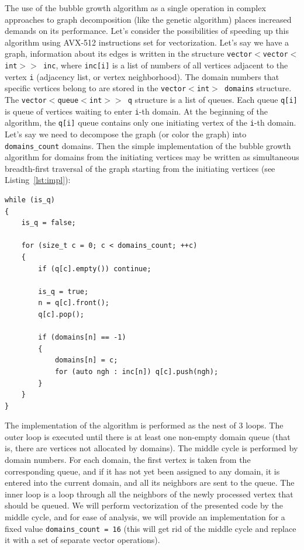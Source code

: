 \documentclass[
11pt,%
tightenlines,%
twoside,%
onecolumn,%
nofloats,%
nobibnotes,%
nofootinbib,%
superscriptaddress,%
noshowpacs,%
centertags]%
{revtex4}
\begin{document}
The use of the bubble growth algorithm as a single operation in complex approaches to graph decomposition (like the genetic algorithm) places increased demands on its performance.
Let's consider the possibilities of speeding up this algorithm using AVX-512 instructions set for vectorization.
Let's say we have a graph, information about its edges is written in the structure \texttt{vector$<$vector$<$int$>>$ inc}, where \texttt{inc[i]} is a list of numbers of all vertices adjacent to the vertex \texttt{i} (adjacency list, or vertex neighborhood).
The domain numbers that specific vertices belong to are stored in the \texttt{vector$<$int$>$ domains} structure.
The \texttt{vector$<$queue$<$int$>>$ q} structure is a list of queues.
Each queue \texttt{q[i]} is queue of vertices waiting to enter \texttt{i}-th domain.
At the beginning of the algorithm, the \texttt{q[i]} queue contains only one initiating vertex of the \texttt{i}-th domain.
Let's say we need to decompose the graph (or color the graph) into \texttt{domains\_count} domains.
Then the simple implementation of the bubble growth algorithm for domains from the initiating vertices may be written as simultaneous breadth-first traversal of the graph starting from the initiating vertices (see Listing~\ref{lst:impl}):

\begin{lstlisting}[caption={Implementation of the bubble domain growth algorithm.},label={lst:impl}]
while (is_q)
{
    is_q = false;

    for (size_t c = 0; c < domains_count; ++c)
    {
        if (q[c].empty()) continue;

        is_q = true;
        n = q[c].front();
        q[c].pop();

        if (domains[n] == -1)
        {
            domains[n] = c;
            for (auto ngh : inc[n]) q[c].push(ngh);
        }
    }
}
\end{lstlisting}

The implementation of the algorithm is performed as the nest of 3 loops.
The outer loop is executed until there is at least one non-empty domain queue (that is, there are vertices not allocated by domains).
The middle cycle is performed by domain numbers.
For each domain, the first vertex is taken from the corresponding queue, and if it has not yet been assigned to any domain, it is entered into the current domain, and all its neighbors are sent to the queue.
The inner loop is a loop through all the neighbors of the newly processed vertex that should be queued.
We will perform vectorization of the presented code by the middle cycle, and for ease of analysis, we will provide an implementation for a fixed value \texttt{domains\_count = 16} (this will get rid of the middle cycle and replace it with a set of separate vector operations).
\end{document}
